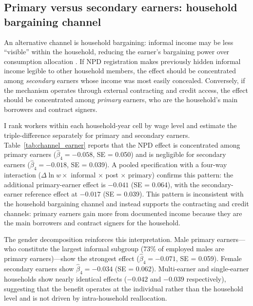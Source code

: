 \documentclass[12pt]{article}
\begin{document}
\subsection{Primary versus secondary earners: household bargaining channel}

An alternative channel is household bargaining: informal income may be less ``visible'' within the household, reducing the earner's bargaining power over consumption allocation \citep{Chiappori1992}. If NPD registration makes previously hidden informal income legible to other household members, the effect should be concentrated among \textit{secondary} earners whose income was most easily concealed. Conversely, if the mechanism operates through external contracting and credit access, the effect should be concentrated among \textit{primary} earners, who are the household's main borrowers and contract signers.

I rank workers within each household-year cell by wage level and estimate the triple-difference separately for primary and secondary earners. Table~\ref{tab:channel_earner} reports that the NPD effect is concentrated among primary earners ($\hat{\beta}_4 = -0.058$, SE = 0.050) and is negligible for secondary earners ($\hat{\beta}_4 = -0.018$, SE = 0.039). A pooled specification with a four-way interaction ($\Delta \ln w \times$ informal $\times$ post $\times$ primary) confirms this pattern: the additional primary-earner effect is $-0.041$ (SE = 0.064), with the secondary-earner reference effect at $-0.017$ (SE = 0.039). This pattern is inconsistent with the household bargaining channel and instead supports the contracting and credit channels: primary earners gain more from documented income because they are the main borrowers and contract signers for the household.

The gender decomposition reinforces this interpretation. Male primary earners---who constitute the largest informal subgroup (73\% of employed males are primary earners)---show the strongest effect ($\hat{\beta}_4 = -0.071$, SE = 0.059). Female secondary earners show $\hat{\beta}_4 = -0.034$ (SE = 0.062). Multi-earner and single-earner households show nearly identical effects ($-0.042$ and $-0.039$ respectively), suggesting that the benefit operates at the individual rather than the household level and is not driven by intra-household reallocation.
\end{document}
